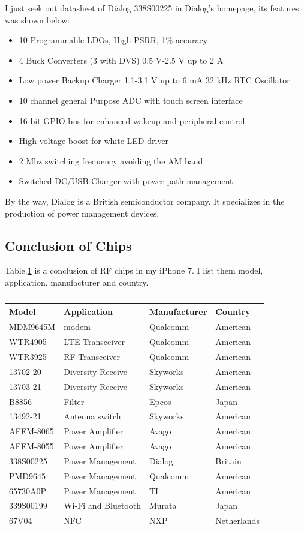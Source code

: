 \documentclass[conference]{IEEEtran}
\begin{document}
I just seek out datasheet of Dialog 338S00225 in Dialog's homepage\cite{dialog.org}, its features was shown below:
\begin{itemize}
	\item 10 Programmable LDOs, High PSRR, 1\% accuracy
	\item 4 Buck Converters (3 with DVS) 0.5 V-2.5 V up to 2 A
	\item Low power Backup Charger 1.1-3.1 V up to 6 mA 32 kHz RTC Oscillator
	\item 10 channel general Purpose ADC with touch screen interface
	\item 16 bit GPIO bus for enhanced wakeup and peripheral control
	\item High voltage boost for white LED driver
	\item 2 Mhz switching frequency avoiding the AM band
	\item Switched DC/USB Charger with power path management
\end{itemize}

By the way, Dialog is a British semiconductor company. It specializes in the production of power management devices.

\subsection{Conclusion of Chips}
Table.\ref{table:Conclusion_of_Chips} is a conclusion of RF chips in my iPhone 7. I list them model, application, manufacturer and country.

\begin{table}[htbp]
	\centering
	\caption{}
	\begin{tabular}{l l l l}
		\hline \hline
		Model & Application & Manufacturer & Country\label{table:Conclusion_of_Chips} \\
		\hline
		MDM9645M&modem&Qualcomm&American\\ 
		\hline
		WTR4905&LTE Transceiver&Qualcomm&American\\
		\hline
		WTR3925&RF Transceiver&Qualcomm&American\\
		\hline
		13702-20&Diversity Receive&Skyworks&American\\
		\hline
		13703-21&Diversity Receive&Skyworks&American\\
		\hline
		B8856&Filter&Epcos&Japan\\
		\hline
		13492-21&Antenna switch&Skyworks&American\\
		\hline
		AFEM-8065&Power Amplifier&Avago&American\\
		\hline
		AFEM-8055&Power Amplifier&Avago&American\\
		\hline
		338S00225&Power Management&Dialog&Britain\\
		\hline
		PMD9645&Power Management&Qualcomm&American\\
		\hline
		65730A0P&Power Management&TI&American\\
		\hline
		339S00199&Wi-Fi and Bluetooth&Murata&Japan\\
		\hline
		67V04&NFC&NXP&Netherlands\\		
		\hline \hline 
	\end{tabular}
\end{table}
\end{document}
